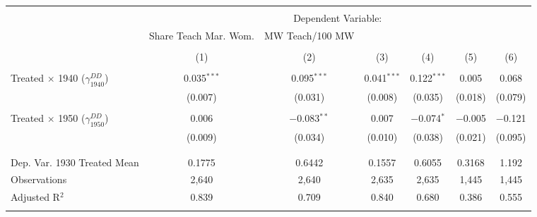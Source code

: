 
\begin{tabular}{@{\extracolsep{5pt}}lcccccc} 
\\[-1.8ex]\hline 
\hline \\[-1.8ex] 
 & \multicolumn{6}{c}{Dependent Variable:} \\ 
\cline{2-7} 
 & Share Teach Mar. Wom. & MW Teach/100 MW &  &  &  &  \\ 
\\[-1.8ex] & (1) & (2) & (3) & (4) & (5) & (6)\\ 
\hline \\[-1.8ex] 
 Treated $\times$ 1940 ($\gamma_{1940}^{DD}$) & 0.035$^{***}$ & 0.095$^{***}$ & 0.041$^{***}$ & 0.122$^{***}$ & 0.005 & 0.068 \\ 
  & (0.007) & (0.031) & (0.008) & (0.035) & (0.018) & (0.079) \\ 
  & & & & & & \\ 
 Treated $\times$ 1950 ($\gamma_{1950}^{DD}$) & 0.006 & $-$0.083$^{**}$ & 0.007 & $-$0.074$^{*}$ & $-$0.005 & $-$0.121 \\ 
  & (0.009) & (0.034) & (0.010) & (0.038) & (0.021) & (0.095) \\ 
  & & & & & & \\ 
\hline \\[-1.8ex] 
Dep. Var. 1930 Treated Mean & 0.1775 & 0.6442 & 0.1557 & 0.6055 & 0.3168 & 1.192 \\ 
Observations & 2,640 & 2,640 & 2,635 & 2,635 & 1,445 & 1,445 \\ 
Adjusted R$^{2}$ & 0.839 & 0.709 & 0.840 & 0.680 & 0.386 & 0.555 \\ 
\hline 
\hline \\[-1.8ex] 
\end{tabular} 
